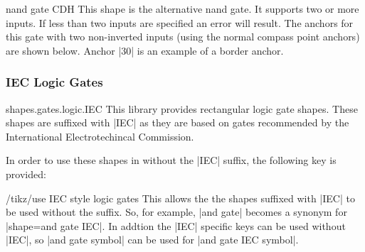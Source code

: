 \begin{shape}{nand gate CDH}
  This shape is the alternative nand gate. It supports two or more inputs.
  If less than two inputs are specified an error will result. 
	The anchors for this gate with two
  non-inverted inputs (using the normal compass point anchors) are
  shown below. Anchor |30| is an example of a border anchor.
  
\begin{codeexample}[]
\Huge
{}
\end{codeexample}

\end{shape}





\subsubsection{IEC Logic Gates}

\begin{pgflibrary}{shapes.gates.logic.IEC}
  This library provides rectangular logic gate shapes. These shapes
  are suffixed with |IEC| as they are based on gates recommended by
  the International Electrotechincal Commission.
\end{pgflibrary}

  In order to use these shapes in \tikzname{} without the |IEC|
  suffix, the following key is provided:
  
\begin{key}{/tikz/use IEC style logic gates}
	This allows the the shapes suffixed with |IEC| to be used without
	the suffix. So, for example, |and gate| becomes a synonym for
	|shape=and gate IEC|. In addtion the |IEC| specific keys can be
	used without |IEC|, so |and gate symbol| can be
	used for |and gate IEC symbol|.
\end{key}

